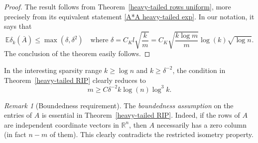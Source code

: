 \documentclass[10pt, openany]{book}
\theoremstyle{remark}
\newtheorem{remark}[theorem]{Remark}
\def \R {\mathbb{R}}
\def \E {\mathbb{E}}
\def \d {\delta}
\begin{document}
\begin{proof}
The result follows from Theorem~\ref{heavy-tailed rows uniform}, more precisely
from its equivalent statement \eqref{A*A heavy-tailed exp}. In our notation, it says that 
$$
\E \d_k(\bar{A}) \le \max(\d,\d^2)
\quad \text{where } 
\d = C_K l \sqrt{\frac{k}{m}} = C_K \sqrt{\frac{k \log m}{m}} \log(k) \sqrt{\log n}.
$$
The conclusion of the theorem easily follows. 
\end{proof}

In the interesting sparsity range $k \ge \log n$ and $k \ge \d^{-2}$, the condition in 
Theorem~\ref{heavy-tailed RIP} clearly reduces to 
$$
m \ge C \d^{-2} k \log (n) \log^{3} k.
$$

\begin{remark}[Boundedness requirement]
  The {\em boundedness assumption} on the entries of $A$ is essential in
  Theorem~\ref{heavy-tailed RIP}. Indeed, if the rows of $A$ are independent
  coordinate vectors in $\R^n$, then $A$ necessarily has a zero column (in fact $n-m$ of them).
  This clearly contradicts the restricted isometry property.
\end{remark}  
\end{document}

